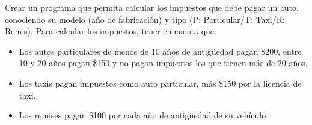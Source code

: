 Crear un programa que permita calcular los impuestos que debe pagar un auto, conociendo su modelo (año de fabricación) y tipo (P: Particular/T: Taxi/R: Remis). Para calcular los impuestos, tener en cuenta que:

\begin{itemize}
	\item Los autos particulares de menos de 10 años de antigüedad pagan \$200, entre 10 y 20 años pagan \$150 y no pagan impuestos los que tienen más de 20 años.
	\item Los taxis pagan impuestos como auto particular, más \$150 por la licencia de taxi.
	\item Los remises pagan \$100 por cada año de antigüedad de su vehículo
\end{itemize}
